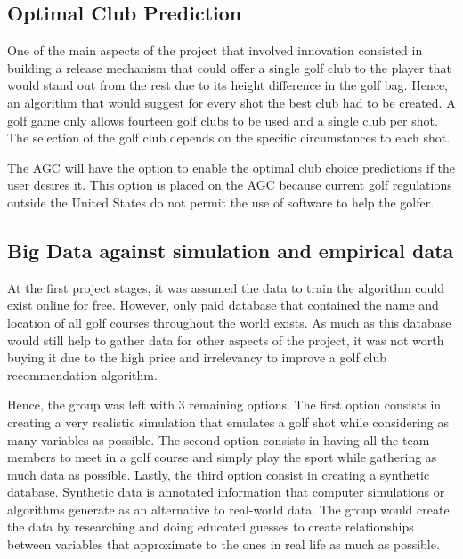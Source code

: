 \documentclass[11pt,landscape]{article}
\begin{document}
\begin{multicols}{3}

\newpage
\section{Optimal Club Prediction}
One of the main aspects of the project that involved innovation consisted in
building a release mechanism that could offer a single golf club to the player
that would stand out from the rest due to its height difference in the golf bag.
Hence, an algorithm that would suggest for every shot the best club had to be
created. A golf game only allows fourteen golf clubs to be used and a single
club per shot. The selection of the golf club depends on the specific
circumstances to each shot.

The AGC will have the option to enable the optimal club choice predictions if
the user desires it. This option is placed on the AGC because current golf
regulations outside the United States do not permit the use of software to help
the golfer.

\subsection{Big Data against simulation and empirical data}
At the first project stages, it was assumed the data to train the algorithm
could exist online for free. However, only paid database that contained the name
and location of all golf courses throughout the world exists. As much as this
database would still help to gather data for other aspects of the project, it
was not worth buying it due to the high price and irrelevancy to improve a
golf club recommendation algorithm.

Hence, the group was left with 3 remaining options. The first option consists in
creating a very realistic simulation that emulates a golf shot while considering
as many variables as possible. The second option consists in having all the team
members to meet in a golf course and simply play the sport while gathering as
much data as possible. Lastly, the third option consist in creating a synthetic
database. Synthetic data is annotated information that computer simulations or
algorithms generate as an alternative to real-world data. The group would create
the data by researching and doing educated guesses to create relationships
between variables that approximate to the ones in real life as much as possible.


\end{multicols}
\end{document}

